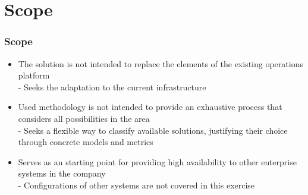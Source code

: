 \section{Scope}

\begin{frame}%
\frametitle{Scope}

\begin{itemize}
  \item The solution is not intended to replace the elements of the existing operations platform\\
	- Seeks the adaptation to the current infrastructure

  \vspace{0.2cm}
	
  \item Used methodology is not intended to provide an exhaustive process that considers all possibilities in the area\\
	- Seeks a flexible way to classify available solutions, justifying their choice through concrete models and metrics
	
  \vspace{0.2cm}
	
  \item Serves as an starting point for providing high availability to other enterprise systems in the company\\
	- Configurations of other systems are not covered in this exercise
\end{itemize}

\end{frame}